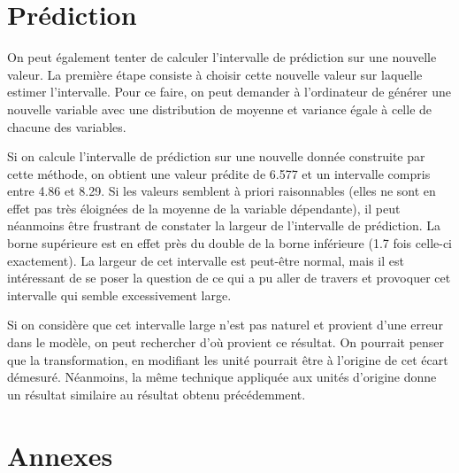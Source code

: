 \documentclass[11pt,a4paper]{article}
\begin{document}
\section{Prédiction}

On peut également tenter de calculer l'intervalle de prédiction sur une nouvelle valeur. La première étape consiste à choisir cette nouvelle valeur sur laquelle estimer l'intervalle. Pour ce faire, on peut demander à l'ordinateur de générer une nouvelle variable avec une distribution de moyenne et variance égale à celle de chacune des variables. 

Si on calcule l'intervalle de prédiction sur une nouvelle donnée construite par cette méthode, on obtient une valeur prédite de 6.577 et un intervalle compris entre 4.86 et 8.29. Si les valeurs semblent à priori raisonnables (elles ne sont en effet pas très éloignées de la moyenne de la variable dépendante), il peut néanmoins être frustrant de constater la largeur de l'intervalle de prédiction. La borne supérieure est en effet près du double de la borne inférieure (1.7 fois celle-ci exactement). La largeur de cet intervalle est peut-être normal, mais il est intéressant de se poser la question de ce qui a pu aller de travers et provoquer cet intervalle qui semble excessivement large.

Si on considère que cet intervalle large n'est pas naturel et provient d'une erreur dans le modèle, on peut rechercher d'où provient ce résultat. On pourrait penser que la transformation, en modifiant les unité pourrait être à l'origine de cet écart démesuré. Néanmoins, la même technique appliquée aux unités d'origine donne un résultat similaire au résultat obtenu précédemment.

\section{Annexes}
\appendix
\end{document}
